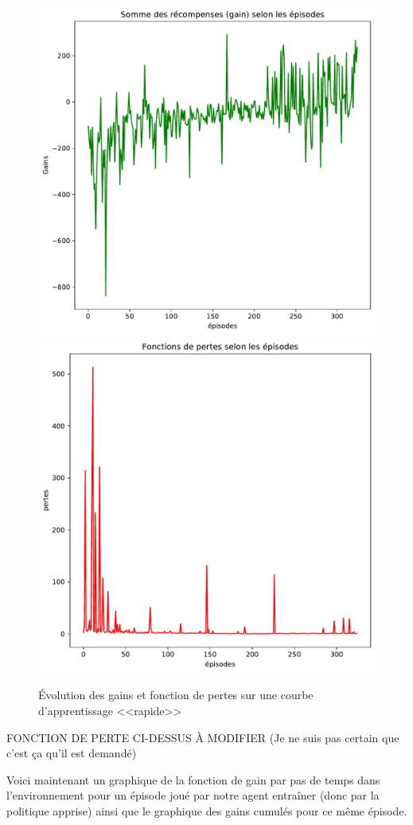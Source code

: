 \documentclass[letterpaper,11pt]{article}
\begin{document}
\begin{enumerate}[label=(\alph*)]
\begin{center}
\begin{figure}[H]
\caption{Évolution des gains et fonction de pertes sur une courbe d'apprentissage <<rapide>>}\label{figure rapide}
\includegraphics[width=0.45\linewidth]{gains_convergence_rapide.pdf} \hfill \includegraphics[width=0.45\linewidth]{pertes_convergence_rapide.pdf}
\end{figure}
\end{center}

FONCTION DE PERTE CI-DESSUS À MODIFIER (Je ne suis pas certain que c'est ça qu'il est demandé)

Voici maintenant un graphique de la fonction de gain par pas de temps dans l'environnement pour un épisode joué par notre agent entraîner (donc par la politique apprise) ainsi que le graphique des gains cumulés pour ce même épisode.
 

\end{enumerate}
\end{document}
